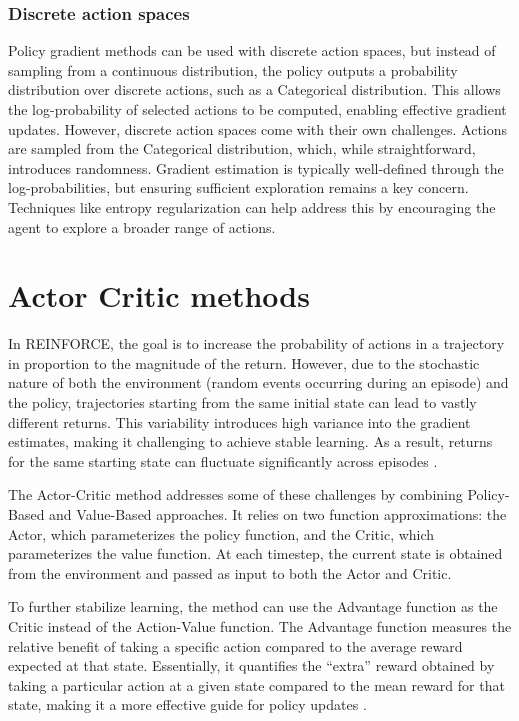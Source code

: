 \documentclass{article}
\begin{document}
\subsubsection{Discrete action spaces}
Policy gradient methods can be used with discrete action spaces, but instead of sampling from a continuous distribution, the policy outputs a probability distribution over discrete actions, such as a Categorical distribution. This allows the log-probability of selected actions to be computed, enabling effective gradient updates. However, discrete action spaces come with their own challenges. Actions are sampled from the Categorical distribution, which, while straightforward, introduces randomness. Gradient estimation is typically well-defined through the log-probabilities, but ensuring sufficient exploration remains a key concern. Techniques like entropy regularization can help address this by encouraging the agent to explore a broader range of actions.

\newpage

\section{Actor Critic methods}
In REINFORCE, the goal is to increase the probability of actions in a trajectory in proportion to the magnitude of the return. However, due to the stochastic nature of both the environment (random events occurring during an episode) and the policy, trajectories starting from the same initial state can lead to vastly different returns. This variability introduces high variance into the gradient estimates, making it challenging to achieve stable learning. As a result, returns for the same starting state can fluctuate significantly across episodes \cite{variance}.

The Actor-Critic method addresses some of these challenges by combining Policy-Based and Value-Based approaches. It relies on two function approximations: the Actor, which parameterizes the policy function, and the Critic, which parameterizes the value function. At each timestep, the current state is obtained from the environment and passed as input to both the Actor and Critic.

To further stabilize learning, the method can use the Advantage function as the Critic instead of the Action-Value function. The Advantage function measures the relative benefit of taking a specific action compared to the average reward expected at that state. Essentially, it quantifies the “extra” reward obtained by taking a particular action at a given state compared to the mean reward for that state, making it a more effective guide for policy updates \cite{actor_critic}.
\end{document}
